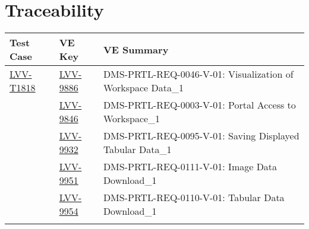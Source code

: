 \section{Traceability}

\begin{longtable}{p{3cm}p{3cm}L{9cm}}
\hline
\textbf{Test Case} & \textbf{VE Key} & \textbf{VE Summary} \\ \hline
\href{https://jira.lsstcorp.org/secure/Tests.jspa#/testCase/LVV-T1818}{LVV-T1818} &
  \href{https://jira.lsstcorp.org/browse/LVV-9886}{LVV-9886}
  & DMS-PRTL-REQ-0046-V-01: Visualization of Workspace Data\_1
 \\ 
 &   \href{https://jira.lsstcorp.org/browse/LVV-9846}{LVV-9846}
  & DMS-PRTL-REQ-0003-V-01: Portal Access to Workspace\_1
 \\ 
 &   \href{https://jira.lsstcorp.org/browse/LVV-9932}{LVV-9932}
  & DMS-PRTL-REQ-0095-V-01: Saving Displayed Tabular Data\_1
 \\ 
 &   \href{https://jira.lsstcorp.org/browse/LVV-9951}{LVV-9951}
  & DMS-PRTL-REQ-0111-V-01: Image Data Download\_1
 \\ 
 &   \href{https://jira.lsstcorp.org/browse/LVV-9954}{LVV-9954}
  & DMS-PRTL-REQ-0110-V-01: Tabular Data Download\_1
 \\ 
\hline
\end{longtable}
